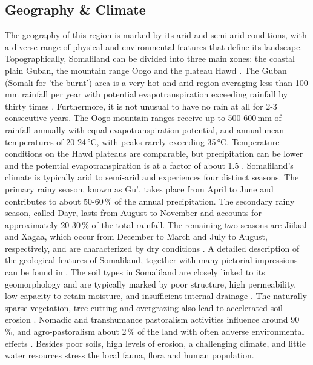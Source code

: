 \subsection{Geography \& Climate}

The geography of this region is marked by its arid and semi-arid conditions, with a diverse range of physical and environmental features that define its landscape. Topographically, Somaliland can be divided into three main zones: the coastal plain Guban, the mountain range Oogo and the plateau Hawd \autocite{republicofsomaliaCountryProfile20212021}. The Guban (Somali for 'the burnt') area is a very hot and arid region averaging less than 100\,mm rainfall per year with potential evapotranspiration exceeding rainfall by thirty times \autocite{salemTerritorialDiagnosticReport2016}. Furthermore, it is not unusual to have no rain at all for 2-3 consecutive years. The Oogo mountain ranges receive up to 500-600\,mm of rainfall annually with equal evapotranspiration potential, and annual mean temperatures of 20-24\,°C, with peaks rarely exceeding 35\,°C. Temperature conditions on the Hawd plateaus are comparable, but precipitation can be lower and the potential evapotranspiration is at a factor of about 1.5 \autocite{abdulkadirAssessmentDroughtRecurrence2017,salemTerritorialDiagnosticReport2016}.\newline
Somaliland's climate is typically arid to semi-arid and experiences four distinct seasons. The primary rainy season, known as Gu', takes place from April to June and contributes to about 50-60\,\% of the annual precipitation. The secondary rainy season, called Dayr, lasts from August to November and accounts for approximately 20-30\,\% of the total rainfall. The remaining two seasons are Jiilaal and Xagaa, which occur from December to March and July to August, respectively, and are characterized by dry conditions \autocite{abdulkadirAssessmentDroughtRecurrence2017,republicofsomaliaCountryProfile20212021}.\newline
A detailed description of the geological features of Somaliland, together with many pictorial impressions can be found in \autocite{petrucciLandscapeLandformsNorthern2022}. The soil types in Somaliland are closely linked to its geomorphology and are typically marked by poor structure, high permeability, low capacity to retain moisture, and insufficient internal drainage \autocite{salemTerritorialDiagnosticReport2016}. The naturally sparse vegetation, tree cutting and overgrazing also lead to accelerated soil erosion \autocite{salemTerritorialDiagnosticReport2016}. Nomadic and transhumance pastoralism activities influence around 90\,\%, and agro-pastoralism about 2\,\% of the land with often adverse environmental effects \autocite{salemTerritorialDiagnosticReport2016}. Besides poor soils, high levels of erosion, a challenging climate, and little water resources stress the local fauna, flora and human population. 

